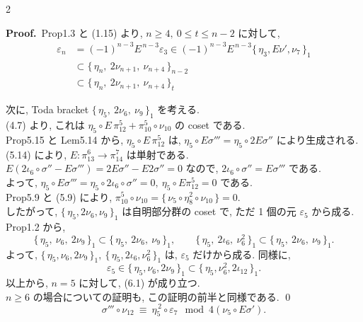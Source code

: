 \documentclass[10pt, leqno]{ltjsarticle}
\newcommand{\todai}[2][]{\{\,#2\,\}_{#1}}      %
\newcommand{\gen}[1]{\{\,#1\,\}}       %
\newcommand{\pit}[2]{\pi_{#1}^{#2}}
\numberwithin{equation}{section}
\theoremstyle{plain}
\theoremstyle{definition}
\theoremstyle{remark}
\begin{document}
\begin{paracol}{2}

\noindent
\textbf{Proof.}\
Prop1.3 と (1.15) より, 
\(n\ge4,\ 0\le t\le n-2\) に対して, 
\[
\begin{align*}
\varepsilon_n 
&= (-1)^{n-3}E^{\,n-3}\varepsilon_3
\in (-1)^{n-3}E^{\,n-3}\todai[1]{\eta_3,E\nu',\nu_7}\\
&\subset \todai[n-2]{\eta_n,\ 2\nu_{n+1},\ \nu_{n+4}}\\
&\subset \todai[t]{\eta_n,\ 2\nu_{n+1},\ \nu_{n+4}}
\end{align*}
\]

次に, Toda bracket \(\todai[1]{\eta_5,\ 2\nu_6,\ \nu_9}\) を考える. \\
(4.7) より, これは
\(\eta_5\circ E\,\pi^{5}_{12}+\pi^{5}_{10}\circ \nu_{10}\) の coset である. \\
Prop5.15 と Lem5.14 から,
\(\eta_5\circ E\,\pi^{5}_{12}\) は, 
\(\eta_5\circ E\sigma''' = \eta_5\circ 2 E\sigma''\) 
により生成される. \\
(5.14) により,
\(E:\pit{13}{6}\to\pit{14}{7}\) は単射である. \\
\(E(2\iota_6\circ\sigma'' - E\sigma''') 
= 2E\sigma'' - E2\sigma'' = 0\) 
なので, 
\(2\iota_6\circ\sigma'' = E\sigma'''\) である. \\
よって, \(\eta_5\circ E\sigma''' = \eta_5\circ2\iota_6\circ\sigma'' = 0,\
\eta_5\circ E\pit{12}{5} = 0\) である. \\
Prop5.9 と (5.9) により, 
\(\pi^{5}_{10}\circ \nu_{10} = \gen{\nu_5\circ \eta_8^2\circ \nu_{10}} = 0 .\) \\
したがって, \(\todai[1]{\eta_5,2\nu_6,\nu_9}\) は自明部分群の coset で, 
ただ 1 個の元 \(\varepsilon_5\) から成る. \\
Prop1.2 から,
\[
\todai[1]{\eta_5,\ \nu_6,\ 2\nu_9}\subset
\todai[1]{\eta_5,\ 2\nu_6,\ \nu_9},\qquad
\todai[1]{\eta_5,\ 2\iota_6,\ \nu_6^2}\subset
\todai[1]{\eta_5,\ 2\nu_6,\ \nu_9}.
\]
よって,
\(\todai[1]{\eta_5, \nu_6, 2\nu_9}, \ \todai[1]{\eta_5, 2\iota_6, \nu_6^2}\)
は, \(\varepsilon_5\) だけから成る. 
同様に, 
\[
\varepsilon_5\in \todai[1]{\eta_5, \nu_6, 2\nu_9}
\subset \todai[1]{\eta_5, \nu_6^2, 2\iota_{12}} .
\]
以上から, \(n=5\) に対して, (6.1) が成り立つ. \\
\(n\ge6\) の場合についての証明も, この証明の前半と同様である. 
\qedhere
\qed
\begin{equation}\label{eq:6.2}
\sigma'''\circ \nu_{12}\ \equiv\ \eta_5^{\,2}\circ \varepsilon_7
\mod{4(\nu_5\circ E\sigma')} .
\end{equation}


\end{paracol}
\end{document}
